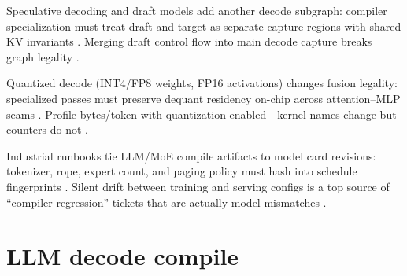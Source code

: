 Speculative decoding and draft models add another decode subgraph: compiler specialization must treat draft and target as separate capture regions with shared KV invariants \citep{kwon2023vllm,patel2025llminference,taxbreak2026,memoryfloor2026,yirage2026,chen2020compilerbasedhardw,liu2024deepseekv3,amd2024aie,dlbook,dao2022flashattention,dao2023flashdecoding,nvidia2024cudagraphs,nvidia2022hopper,semianalysis2024tma,amd2024xdna}. Merging draft control flow into main decode capture breaks graph legality \citep{nvidia2024cudagraphs,kwon2023vllm,yirage2026,chen2020compilerbasedhardw,patel2025llminference,memoryfloor2026,taxbreak2026,liu2024deepseekv3,amd2024aie,dlbook,dao2022flashattention,dao2023flashdecoding,nvidia2024cudagraphs,nvidia2022hopper,semianalysis2024tma,amd2024xdna}.

Quantized decode (INT4/FP8 weights, FP16 activations) changes fusion legality: specialized passes must preserve dequant residency on-chip across attention--MLP seams \citep{semianalysis2024tma,nvidia2022hopper,yirage2026,chen2020compilerbasedhardw,patel2025llminference,kwon2023vllm,liu2024deepseekv3,memoryfloor2026,taxbreak2026,amd2024aie,dlbook,dao2022flashattention,dao2023flashdecoding,nvidia2024cudagraphs,amd2024xdna}. Profile bytes/token with quantization enabled---kernel names change but counters do not \citep{patel2025llminference,memoryfloor2026,taxbreak2026,yirage2026,chen2020compilerbasedhardw,kwon2023vllm,liu2024deepseekv3,amd2024aie,dlbook,dao2022flashattention,dao2023flashdecoding,nvidia2024cudagraphs,nvidia2022hopper,semianalysis2024tma,amd2024xdna}.

Industrial runbooks tie LLM/MoE compile artifacts to model card revisions: tokenizer, rope, expert count, and paging policy must hash into schedule fingerprints \citep{kwon2023vllm,liu2024deepseekv3,yirage2026,chen2020compilerbasedhardw,patel2025llminference,memoryfloor2026,taxbreak2026,amd2024aie,dlbook,dao2022flashattention,dao2023flashdecoding,nvidia2024cudagraphs,nvidia2022hopper,semianalysis2024tma,amd2024xdna}. Silent drift between training and serving configs is a top source of ``compiler regression'' tickets that are actually model mismatches \citep{patel2025llminference,kwon2023vllm,yirage2026,chen2020compilerbasedhardw,liu2024deepseekv3,memoryfloor2026,taxbreak2026,amd2024aie,dlbook,dao2022flashattention,dao2023flashdecoding,nvidia2024cudagraphs,nvidia2022hopper,semianalysis2024tma,amd2024xdna}.

\section{LLM decode compile}
\label{sec:ch23_llm_decode_compile}

